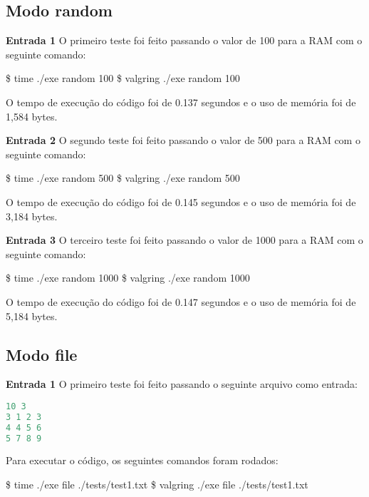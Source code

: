 \documentclass{article}
\begin{document}
\subsection{Modo random}
\noindent \textbf{Entrada 1}
O primeiro teste foi feito passando o valor de 100 para a RAM com o seguinte comando:

\begin{tcolorbox}[title=Comando da entrada 1 do modo random,width=\linewidth]
   	\$ time ./exe random 100
    \$ valgring ./exe random 100
\end{tcolorbox}

O tempo de execução do código foi de 0.137 segundos e o uso de memória foi de 1,584	bytes.

\hfill\break

\noindent \textbf{Entrada 2}
O segundo teste foi feito passando o valor de 500 para a RAM com o seguinte comando:

\begin{tcolorbox}[title=Comando da entrada 2 do modo random,width=\linewidth]
   	\$ time ./exe random 500
    \$ valgring ./exe random 500
\end{tcolorbox}

O tempo de execução do código foi de 0.145 segundos e o uso de memória foi de 3,184	bytes.

\hfill\break

\noindent \textbf{Entrada 3}
O terceiro teste foi feito passando o valor de 1000 para a RAM com o seguinte comando:

\begin{tcolorbox}[title=Comando da entrada 2 do modo random,width=\linewidth]
   	\$ time ./exe random 1000
    \$ valgring ./exe random 1000
\end{tcolorbox}

O tempo de execução do código foi de 0.147 segundos e o uso de memória foi de 5,184	bytes.


\subsection{Modo file}
\noindent \textbf{Entrada 1}
O primeiro teste foi feito passando o seguinte arquivo como entrada:

 \begin{lstlisting}[caption={Arquivo de entrada 1.},label={lst:cod6},language=C]
10 3
3 1 2 3
4 4 5 6
5 7 8 9
 \end{lstlisting}

Para executar o código, os seguintes comandos foram rodados:
\begin{tcolorbox}[title=Comando da entrada 1 do modo file,width=\linewidth]
   	\$ time ./exe file ./tests/test1.txt
    \$ valgring ./exe file ./tests/test1.txt
\end{tcolorbox}
\end{document}

